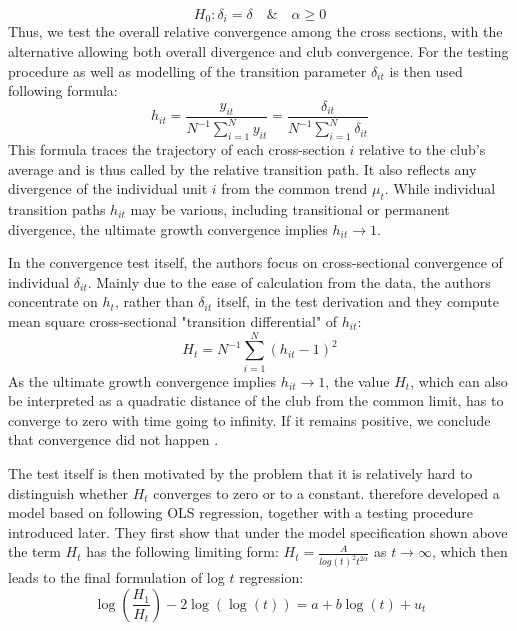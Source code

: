 \documentclass[11pt]{article}
\begin{document}
\begin{equation} \label{eq6} H_0: \delta_{i} = \delta \quad \& \quad \alpha \geq 0 \end{equation} Thus, we test the overall relative convergence among the cross sections, with the alternative allowing both overall divergence and club convergence.
For the testing procedure as well as modelling of the transition parameter $\delta_{it}$ is then used following formula:
\begin{equation}\label{eq8}h_{it} = \frac{y_{it}}{N^{-1}\sum\limits_{i=1}^Ny_{it}} = \frac{\delta_{it}}{N^{-1}\sum\limits_{i=1}^N\delta_{it}}\end{equation}
This formula traces the trajectory of each cross-section $i$ relative to the club's average and is thus called by \citet{phillips2009economic} the relative transition path. It also reflects any divergence of the individual unit $i$ from the common trend $\mu_t$. While individual transition paths $h_{it}$ may be various, including transitional or permanent divergence, the ultimate growth convergence implies \(h_{it} \rightarrow 1\).

In the convergence test itself, the authors focus on cross-sectional convergence of individual $\delta_{it}$. Mainly due to the ease of calculation from the data, the authors concentrate on $h_{t}$, rather than $\delta_{it}$ itself, in the test derivation and they compute mean square cross-sectional "transition differential" of $h_{it}$:
\begin{equation}\label{eq9}H_t = N^{-1}\sum\limits_{i=1}^N(h_{it} - 1)^2 \end{equation}
As the ultimate growth convergence implies \(h_{it} \rightarrow 1\), the value $H_{t}$, which can also be interpreted as a quadratic distance of the club from the common limit, has to converge to zero with time going to infinity. If it remains positive, we conclude that convergence did not happen \citep{phillips2009economic}.

The test itself is then motivated by the problem that it is relatively hard to distinguish whether $H_t$ converges to zero or to a constant. \citet{phillips2007transition} therefore developed a model based on following OLS regression, together with a testing procedure introduced later. They first show that under the model specification shown above the term $H_{t}$ has the following limiting form: \(H_{t} = \frac{A}{log (t)^2t^{2\alpha}}\) as \(t \rightarrow \infty\), which then leads to the final formulation of log $t$ regression:
\begin{equation}\label{eq10}\log(\frac{H_1}{H_t})-2\log(\log(t)) = a + b\log(t) + u_t\end{equation}
\end{document}
